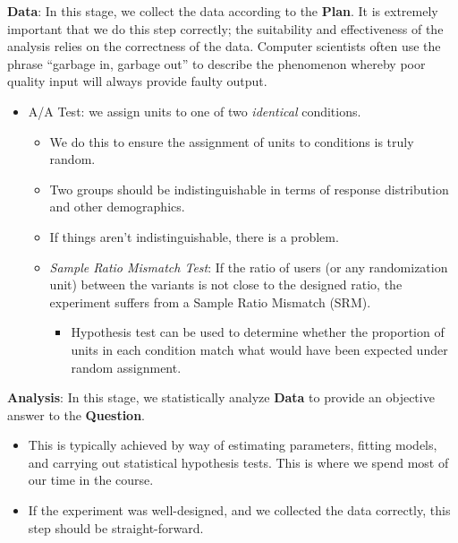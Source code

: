 \begin{framed}
      \textbf{Data}: In this stage, we collect the data according to the \textbf{Plan}.
      It is extremely important that we do this step correctly; the suitability and effectiveness
      of the analysis relies on the correctness of the data. Computer scientists often
      use the phrase
      ``garbage in, garbage out'' to describe the phenomenon whereby poor
      quality input will always provide faulty output.
      \begin{itemize}
            \item A/A Test: we assign units to one of two \emph{identical} conditions.
                  \begin{itemize}
                        \item We do this to ensure the assignment of units to conditions is truly random.
                        \item Two groups should be indistinguishable in terms of response distribution
                              and other demographics.
                        \item If things aren't indistinguishable, there is a problem.
                        \item \emph{Sample Ratio Mismatch Test}: If the ratio of users
                              (or any randomization unit) between the variants is not close
                              to the designed ratio, the experiment suffers from a Sample Ratio Mismatch
                              (SRM).
                              \begin{itemize}
                                    \item Hypothesis test can be used to determine whether the proportion
                                          of units in each condition match what would have been expected under
                                          random assignment.
                              \end{itemize}
                  \end{itemize}
      \end{itemize}
\end{framed}
\begin{framed}
      \textbf{Analysis}: In this stage, we statistically analyze \textbf{Data}
      to provide an objective answer to the \textbf{Question}.
      \begin{itemize}
            \item This is typically achieved by way of estimating parameters, fitting models,
                  and carrying out statistical hypothesis tests. This is where we spend most of
                  our time in the course.
            \item If the experiment was well-designed, and we collected the data correctly, this
                  step should be straight-forward.
      \end{itemize}
\end{framed}
